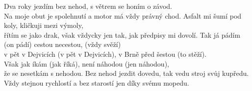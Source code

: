 \ve{}
Dva roky jezdím bez nehod,
s větrem se honím o závod.\\
Na moje obut je spolehnutí
a motor má vždy právný chod.
\ve{}
Asfalt mi šumí pod koly,
kličkuji mezi výmoly,\\
řítím se jako drak, však vždycky jen tak,
jak předpisy mi dovolí.
\cho{}
Tak já pádím (on pádí)
cestou necestou, (vždy svěží)\\
v pět v Dejvicích (v pět v Dejvicích),
v Brně před šestou (to stěží).\\
Však jak íkám (jak říká),
není náhodou (jen náhodou),\\
že se nesetkám s nehodou.
\ve{}
Bez nehod jezdit dovedu,
tak vedu stroj svůj kupředu.\\
Vždy stejnou rychlostí a bez starostí
jen díky svému mopedu.
\esong{}
